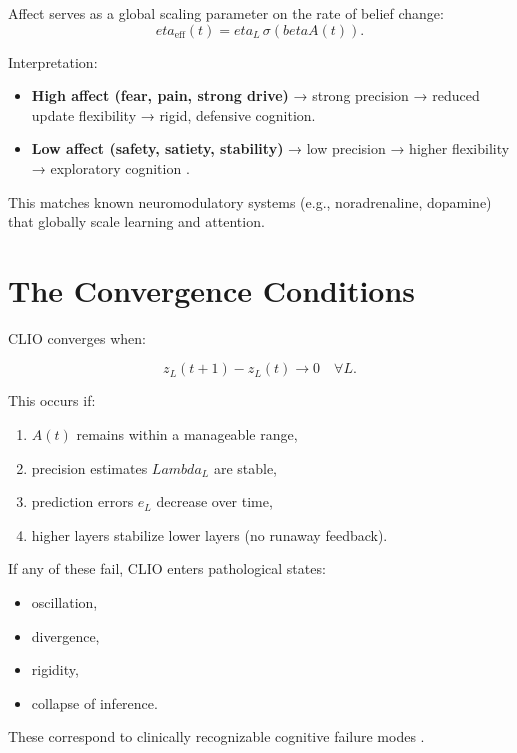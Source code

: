 \documentclass[12pt,oneside]{book}
\theoremstyle{plain}
\theoremstyle{definition}
\let\citep\parencite
\def\beta{beta}%
\def\eta{eta}%
\def\Lambda{Lambda}%
\begin{document}
Affect serves as a global scaling parameter on the rate of belief change:
\[
\eta_{\mathrm{eff}}(t)
=
\eta_L \, \sigma(\beta A(t)).
\]

Interpretation:

\begin{itemize}
    \item \textbf{High affect (fear, pain, strong drive)}
    → strong precision → reduced update flexibility → rigid, defensive cognition.

    \item \textbf{Low affect (safety, satiety, stability)}
    → low precision → higher flexibility → exploratory cognition
    \citep{seth2016review,solms2021hidden}.
\end{itemize}

This matches known neuromodulatory systems (e.g., noradrenaline, dopamine)
that globally scale learning and attention.

\section{The Convergence Conditions}

CLIO converges when:

\[
z_L(t+1) - z_L(t) \rightarrow 0
\quad \forall L.
\]

This occurs if:

\begin{enumerate}
  \item $A(t)$ remains within a manageable range,
  \item precision estimates $\Lambda_L$ are stable,
  \item prediction errors $e_L$ decrease over time,
  \item higher layers stabilize lower layers (no runaway feedback).
\end{enumerate}

If any of these fail, CLIO enters pathological states:

\begin{itemize}
  \item oscillation,
  \item divergence,
  \item rigidity,
  \item collapse of inference.
\end{itemize}

These correspond to clinically recognizable cognitive failure modes
\citep{montague2012computational,corlett2016prediction}.
\end{document}
